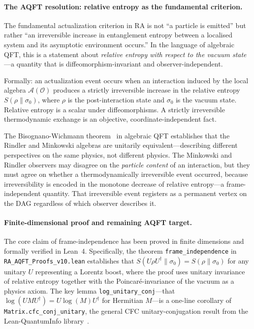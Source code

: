 \documentclass[11pt,a4paper]{article}
\theoremstyle{plain}
\theoremstyle{definition}
\theoremstyle{remark}
\begin{document}
\paragraph{The AQFT resolution: relative entropy as the fundamental criterion.}
The fundamental actualization criterion in RA is not ``a particle is emitted''
but rather ``an irreversible increase in entanglement entropy between a
localised system and its asymptotic environment occurs.'' In the language of
algebraic QFT, this is a statement about \emph{relative entropy with respect to
the vacuum state}---a quantity that is diffeomorphism-invariant and
observer-independent.

Formally: an actualization event occurs when an interaction induced by the
local algebra $\mathcal{A}(\mathcal{O})$ produces a strictly irreversible
increase in the relative entropy $S(\rho \| \sigma_0)$, where $\rho$ is the
post-interaction state and $\sigma_0$ is the vacuum state. Relative entropy is a
scalar under diffeomorphisms. A strictly irreversible thermodynamic exchange is
an objective, coordinate-independent fact.

The Bisognano-Wichmann theorem~\citep{BisognanoWichmann1975} in algebraic QFT
establishes that the Rindler and Minkowski algebras are unitarily
equivalent---describing different perspectives on the same physics, not different
physics. The Minkowski and Rindler observers may disagree on the \emph{particle
content} of an interaction, but they must agree on whether a thermodynamically
irreversible event occurred, because irreversibility is encoded in the
monotone decrease of relative entropy---a frame-independent quantity. That
irreversible event registers as a permanent vertex on the DAG regardless of which
observer describes it.

\paragraph{Finite-dimensional proof and remaining AQFT target.}
The core claim of frame-independence has been proved in finite dimensions and
formally verified in Lean~4. Specifically, the theorem
\texttt{frame\_independence} in \texttt{RA\_AQFT\_Proofs\_v10.lean} establishes
that $S(U\rho U^\dagger \| \sigma_0) = S(\rho \| \sigma_0)$ for any unitary $U$
representing a Lorentz boost, where the proof uses unitary invariance of relative
entropy together with the Poincar\'{e}-invariance of the vacuum as a physics
axiom. The key lemma \texttt{log\_unitary\_conj}---that $\log(UMU^\dagger) =
U\log(M)U^\dagger$ for Hermitian $M$---is a one-line corollary of
\texttt{Matrix.cfc\_conj\_unitary}, the general CFC unitary-conjugation result
from the Lean-QuantumInfo library~\citep{Meiburg2025LQI}.
\end{document}
